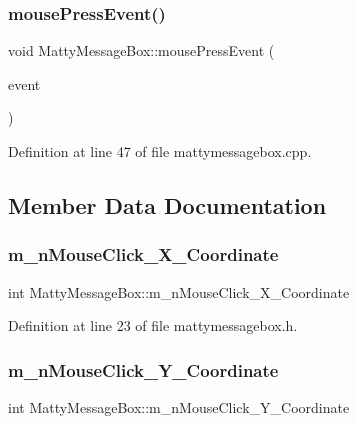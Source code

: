 \subsubsection{\texorpdfstring{mouse\+Press\+Event()}{mousePressEvent()}}
{\footnotesize\ttfamily void Matty\+Message\+Box\+::mouse\+Press\+Event (\begin{DoxyParamCaption}\item[{Q\+Mouse\+Event $\ast$}]{event }\end{DoxyParamCaption})\hspace{0.3cm}{\ttfamily [private]}}



Definition at line 47 of file mattymessagebox.\+cpp.



\subsection{Member Data Documentation}
\hypertarget{classMattyMessageBox_ad3676e7eb43e10f71b8e48855f55bcc8}{}\label{classMattyMessageBox_ad3676e7eb43e10f71b8e48855f55bcc8} 
\subsubsection{\texorpdfstring{m\+\_\+n\+Mouse\+Click\+\_\+\+X\+\_\+\+Coordinate}{m\_nMouseClick\_X\_Coordinate}}
{\footnotesize\ttfamily int Matty\+Message\+Box\+::m\+\_\+n\+Mouse\+Click\+\_\+\+X\+\_\+\+Coordinate\hspace{0.3cm}{\ttfamily [private]}}



Definition at line 23 of file mattymessagebox.\+h.

\hypertarget{classMattyMessageBox_abe066f7b4122bd9dcb602661ec318302}{}\label{classMattyMessageBox_abe066f7b4122bd9dcb602661ec318302} 
\subsubsection{\texorpdfstring{m\+\_\+n\+Mouse\+Click\+\_\+\+Y\+\_\+\+Coordinate}{m\_nMouseClick\_Y\_Coordinate}}
{\footnotesize\ttfamily int Matty\+Message\+Box\+::m\+\_\+n\+Mouse\+Click\+\_\+\+Y\+\_\+\+Coordinate\hspace{0.3cm}{\ttfamily [private]}}




